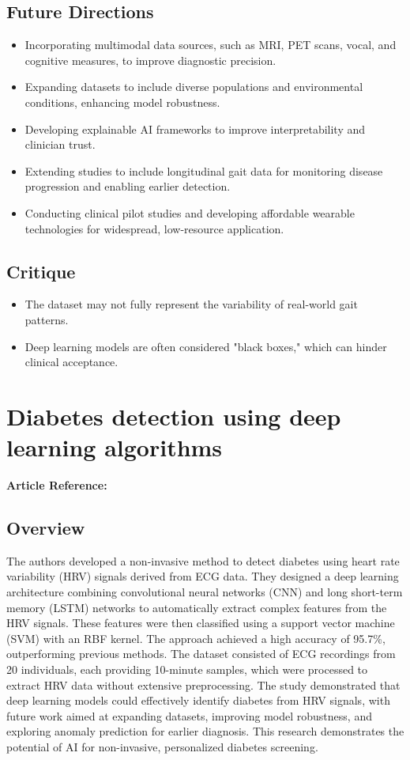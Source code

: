 \subsection*{Future Directions}
\begin{itemize}
    \item Incorporating multimodal data sources, such as MRI, PET scans, vocal, and cognitive measures, to improve diagnostic precision.
    \item Expanding datasets to include diverse populations and environmental conditions, enhancing model robustness.
    \item Developing explainable AI frameworks to improve interpretability and clinician trust.
    \item Extending studies to include longitudinal gait data for monitoring disease progression and enabling earlier detection.
    \item Conducting clinical pilot studies and developing affordable wearable technologies for widespread, low-resource application.
\end{itemize}
\subsection*{Critique}
\begin{itemize}
    \item The dataset may not fully represent the variability of real-world gait patterns.    
    \item Deep learning models are often considered "black boxes," which can hinder clinical acceptance.
\end{itemize}

\section{Diabetes detection using deep learning algorithms}
\textbf{Article Reference:} \cite{article_4}

\subsection*{Overview}
The authors developed a non-invasive method to detect diabetes using heart rate variability (HRV) signals derived from ECG data. They designed a deep learning architecture combining convolutional neural networks (CNN) and long short-term memory (LSTM) networks to automatically extract complex features from the HRV signals. These features were then classified using a support vector machine (SVM) with an RBF kernel. The approach achieved a high accuracy of 95.7\%, outperforming previous methods. The dataset consisted of ECG recordings from 20 individuals, each providing 10-minute samples, which were processed to extract HRV data without extensive preprocessing. The study demonstrated that deep learning models could effectively identify diabetes from HRV signals, with future work aimed at expanding datasets, improving model robustness, and exploring anomaly prediction for earlier diagnosis. This research demonstrates the potential of AI for non-invasive, personalized diabetes screening.
